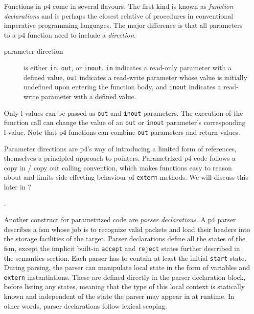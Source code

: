 Functions in \acrshort{p4} come in several flavours. The first kind is known as
\emph{function declarations} and is perhaps the closest relative of procedures
in conventional imperative programming languages. The major difference is that
all parameters to a \acrshort{p4} function need to include a \emph{direction}.

\begin{description}
	\item[parameter direction] is either \texttt{in}, \texttt{out}, or
	\texttt{inout}. \texttt{in} indicates a read-only parameter with a defined
	value, \texttt{out} indicates a read-write parameter whose value is
	initially undefined upon entering the function body, and \texttt{inout}
	indicates a read-write parameter with a defined value.
\end{description}

Only l-values can be passed as \texttt{out} and
\texttt{inout} parameters. The execution of the function call can change the
value of an \texttt{out} or \texttt{inout} parameter's corresponding l-value.
Note that \acrshort{p4} functions can combine \texttt{out} parameters and return
values.

Parameter directions are \acrshort{p4}'s way of introducing a limited form of
references, themselves a principled approach to pointers. Parametrized
\acrshort{p4} code follows a copy in / copy out calling convention, which makes
functions easy to reason about and limits side effecting behaviour of
\texttt{extern} methods. We will discuss this later in ?

.

Another construct for parametrized code are \emph{parser declarations}. A
\acrshort{p4} parser describes a \acrlong{fsm} whose job is to recognize valid
packets and load their headers into the storage facilities of the target. Parser
declarations define all the states of the \acrshort{fsm}, except the implicit
built-in \texttt{accept} and \texttt{reject} states further described in the
semantics section. Each parser has to contain at least the
initial \texttt{start} state. During parsing, the parser can manipulate local
state in the form of variables and \texttt{extern}
instantiations. These are defined directly in the parser declaration block,
before listing any states, meaning that the type of this local context is
statically known and independent of the state the parser may appear in at
runtime. In other words, parser declarations follow lexical scoping.

